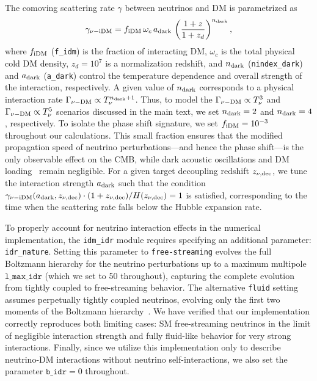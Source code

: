 \begin{subappendices}
The comoving scattering rate $\gamma$ between neutrinos and DM is parametrized as
\begin{equation}
    \gamma_{\nu-\rm iDM}=f_{\rm iDM}\, \omega_{c}\,a_{\rm dark}\,\left(\frac{1+z}{1+z_d}\right)^{n_{\rm dark}}, \label{eq:ch13-A1}
\end{equation}
where $f_{\rm iDM}$ (\texttt{f\_idm})  is the fraction of interacting DM, $\omega_c$ is the total physical cold DM density, $z_d=10^7$ is a normalization redshift, and $n_{\rm dark}$ (\texttt{nindex\_dark}) and $a_{\rm dark}$ (\texttt{a\_dark}) control the temperature dependence and overall strength of the interaction, respectively. A given value of $n_{\rm dark}$ corresponds to a physical interaction rate $\Gamma_{\nu-\rm DM}\propto T_\nu^{n_{\rm dark} +1}$.  Thus, to model the $\Gamma_{\nu-\rm DM} \propto T_\nu^3$ and $\Gamma_{\nu-\rm DM} \propto T_\nu^5$ scenarios discussed in the main text, we set $n_{\rm dark} = 2$ and $n_{\rm dark} = 4$, respectively. To isolate the phase shift signature, we set $f_{\rm iDM} = 10^{-3}$ throughout our calculations. This small fraction ensures that the modified propagation speed of neutrino perturbations---and hence the phase shift---is the only observable effect on the CMB, while dark acoustic oscillations and DM loading~\cite{Ghosh:2024wva} remain negligible. For a given target decoupling redshift $z_{\nu,\rm dec}$, we tune the interaction strength $a_{\rm dark}$ such that the condition    $\gamma_{\nu-\rm iDM}(a_{\rm dark},z_{\nu,\rm dec})\cdot (1+z_{\nu,\rm dec})/H(z_{\rm \nu,dec})=1$ is satisfied, corresponding to the time when the scattering rate falls below the Hubble expansion rate.

To properly account for neutrino interaction effects in the numerical implementation, the \texttt{idm\_idr} module requires specifying an additional parameter: \texttt{idr\_nature}. Setting this parameter to \texttt{free-streaming} evolves the full Boltzmann hierarchy for the neutrino perturbations up to a maximum multipole $\texttt{l\_max\_idr}$ (which we set to 50 throughout), capturing the complete evolution from tightly coupled to free-streaming behavior. The alternative \texttt{fluid} setting assumes perpetually tightly coupled neutrinos, evolving only the first two moments of the Boltzmann hierarchy~\cite{Archidiacono:2019wdp}. We have verified that our implementation correctly reproduces both limiting cases: SM free-streaming neutrinos in the limit of negligible interaction strength and fully fluid-like behavior for very strong interactions.  Finally, since we utilize this implementation only to describe neutrino-DM interactions without neutrino self-interactions, we also set the parameter $\texttt{b\_idr}=0$ throughout.


\end{subappendices}
